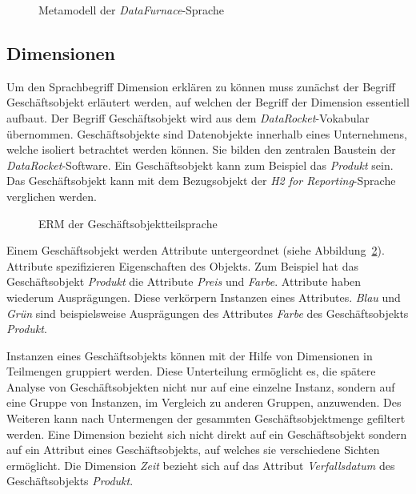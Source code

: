 \documentclass[
  language=german, %
  type=bachelor,%
  ngerman
]{isthesis}
\begin{document}
\begin{content}

  \begin{figure}
    \resizebox{\columnwidth}{!}{}
    \caption{Metamodell der \textit{DataFurnace}-Sprache}\label{fig:language_spec-erm}
  \end{figure}

  \subsection{Dimensionen}\label{subsec:dimension}

	Um den Sprachbegriff Dimension erklären zu können muss zunächst der Begriff
	Geschäftsobjekt erläutert werden, auf welchen der Begriff der Dimension
	essentiell aufbaut. Der Begriff Geschäftsobjekt wird aus dem
	\textit{DataRocket}-Vokabular übernommen. Geschäftsobjekte sind Datenobjekte
	innerhalb eines Unternehmens, welche isoliert betrachtet werden können. Sie
	bilden den zentralen Baustein der \textit{DataRocket}-Software. Ein
	Geschäftsobjekt kann zum Beispiel das \textit{Produkt} sein.  Das
	Geschäftsobjekt kann mit dem Bezugsobjekt der \textit{H2 for
	Reporting}-Sprache verglichen werden.

  \begin{figure}
    \resizebox{200px}{!}{}
    \caption{\acrshort{ERM} der Geschäftsobjektteilsprache}\label{geschaeftsobjekt}
  \end{figure}

  Einem Geschäftsobjekt werden Attribute untergeordnet (siehe
  Abbildung~\ref{geschaeftsobjekt}). Attribute spezifizieren Eigenschaften des
  Objekts. Zum Beispiel hat das Geschäftsobjekt \textit{Produkt} die Attribute
  \textit{Preis} und \textit{Farbe}. Attribute haben wiederum Ausprägungen.
  Diese verkörpern Instanzen eines Attributes. \textit{Blau} und \textit{Grün}
  sind beispielsweise Ausprägungen des Attributes \textit{Farbe} des
  Geschäftsobjekts \textit{Produkt}.

	Instanzen eines Geschäftsobjekts können mit der Hilfe von Dimensionen in
	Teilmengen gruppiert werden. Diese Unterteilung ermöglicht es, die spätere
	Analyse von Geschäftsobjekten nicht nur auf eine einzelne Instanz, sondern
	auf eine Gruppe von Instanzen, \ggf{} im Vergleich zu anderen Gruppen,
	anzuwenden. Des Weiteren kann nach Untermengen der gesammten
	Geschäftsobjektmenge gefiltert werden.  Eine Dimension bezieht sich nicht
	direkt auf ein Geschäftsobjekt sondern auf ein Attribut eines
	Geschäftsobjekts, auf welches sie verschiedene Sichten ermöglicht. Die
	Dimension \textit{Zeit} bezieht sich \zB{} auf das Attribut
	\textit{Verfallsdatum} des Geschäftsobjekts \textit{Produkt}. 


\end{content}
\end{document}

